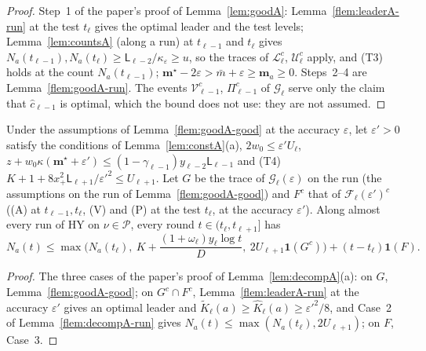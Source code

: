 \documentclass[11pt]{article}
\newcommand{\cP}{\mathcal P}
\begin{document}
\begin{proof}
Step~1 of the paper's proof of Lemma~\ref{lem:goodA}: Lemma~\ref{flem:leaderA-run} at the test
$t_\ell$ gives the optimal leader and the test levels; Lemma~\ref{lem:countsA} (along a run) at
$t_{\ell-1}$ and $t_\ell$ gives $N_a(t_{\ell-1}),N_a(t_\ell)\ge\mathsf
L_{\ell-2}/\kappa_\varepsilon\ge u$, so the traces of $\mathcal L_\ell^c$, $\mathcal U_\ell^c$
apply, and (T3) holds at the count $N_a(t_{\ell-1})$; $\mathbf m^\star-2\varepsilon>\bar m+
\varepsilon\ge\mathbf m_a\ge0$. Steps~2--4 are Lemma~\ref{flem:goodA-run}. The events
$\mathcal V_{\ell-1}^c$, $\Pi_{\ell-1}^c$ of $\mathcal G_\ell$ serve only the claim that
$\hat c_{\ell-1}$ is optimal, which the bound does not use: they are not assumed.
\end{proof}

\begin{lemma}\label{flem:decompA-DA}
Under the assumptions of Lemma~\ref{flem:goodA-good} at the accuracy $\varepsilon$, let
$\varepsilon'>0$ satisfy the conditions of Lemma~\ref{lem:constA}(a), $2w_0\le\varepsilon'U_\ell$,
$z+w_0\kappa(\mathbf m^\star+\varepsilon')\le(1-\gamma_{\ell-1})y_{\ell-2}\mathsf L_{\ell-1}$ and
(T4) $K+1+8x_+^2\mathsf L_{\ell+1}/\varepsilon'^2\le U_{\ell+1}$. Let $G$ be the trace of
$\mathcal G_\ell(\varepsilon)$ on the run (the assumptions on the run of
Lemma~\ref{flem:goodA-good}) and $F^c$ that of $\mathcal F_\ell(\varepsilon')^c$ ((A) at
$t_{\ell-1},t_\ell$, (V) and (P) at the test $t_\ell$, at the accuracy $\varepsilon'$). Along almost
every run of HY on $\nu\in\cP$, every round $t\in(t_\ell,t_{\ell+1}]$ has
\[
N_a(t)\le\max\Big(N_a(t_\ell),\ K+\frac{(1+\omega_\ell)y_\ell\log t}{D},\ 2U_{\ell+1}\mathbf
1(G^c)\Big)+(t-t_\ell)\mathbf 1(F).
\]
\end{lemma}

\begin{proof}
The three cases of the paper's proof of Lemma~\ref{lem:decompA}(a): on $G$,
Lemma~\ref{flem:goodA-good}; on $G^c\cap F^c$, Lemma~\ref{flem:leaderA-run} at the accuracy
$\varepsilon'$ gives an optimal leader and $\tilde K_\ell(a)\ge\hat K_\ell(a)\ge\varepsilon'^2/8$,
and Case~2 of Lemma~\ref{flem:decompA-run} gives $N_a(t)\le\max(N_a(t_\ell),2U_{\ell+1})$; on $F$,
Case~3.
\end{proof}
\end{document}
